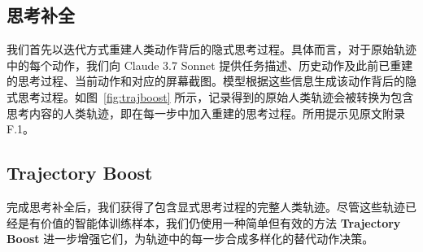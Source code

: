 \documentclass[10pt]{article}
\begin{document}
\begin{table}[t]
\centering
\small
{}
\caption{统一动作空间 $\mathcal{A}$。}
\label{tab:action-space}
\end{table}

\subsection{思考补全}
\label{sec: thought completion}

我们首先以迭代方式重建人类动作背后的隐式思考过程。具体而言，对于原始轨迹中的每个动作，我们向 Claude 3.7 Sonnet 提供任务描述、历史动作及此前已重建的思考过程、当前动作和对应的屏幕截图。模型根据这些信息生成该动作背后的隐式思考过程。如图~\ref{fig:trajboost} 所示，记录得到的原始人类轨迹会被转换为包含思考内容的人类轨迹，即在每一步中加入重建的思考过程。所用提示见原文附录 F.1。

\subsection{Trajectory Boost}
\label{sec:trajboost}

完成思考补全后，我们获得了包含显式思考过程的完整人类轨迹。尽管这些轨迹已经是有价值的智能体训练样本，我们仍使用一种简单但有效的方法 \textbf{Trajectory Boost} 进一步增强它们，为轨迹中的每一步合成多样化的替代动作决策。
\end{document}
